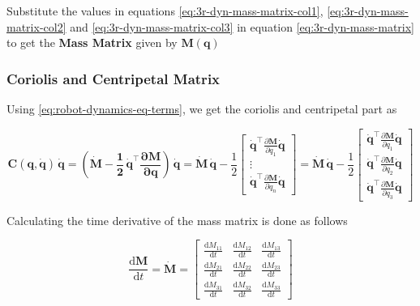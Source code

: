 \noindent
Substitute the values in equations \ref{eq:3r-dyn-mass-matrix-col1}, \ref{eq:3r-dyn-mass-matrix-col2} and \ref{eq:3r-dyn-mass-matrix-col3} in equation \ref{eq:3r-dyn-mass-matrix} to get the \textbf{Mass Matrix} given by $\mathbf{M(q)}$

\subsubsection*{Coriolis and Centripetal Matrix}

Using \ref{eq:robot-dynamics-eq-terms}, we get the coriolis and centripetal part as

\begin{equation}
    \mathbf{C(q, \dot{q}) \, \dot{q}} = \left ( \mathbf{ \dot{M} - \frac{1}{2} \, \dot{q}^\top \frac{\partial M}{\partial q} } \right ) \, \mathbf{\dot{q}} = \mathbf{\dot{M} \, \dot{q}} - \frac{1}{2} \begin{bmatrix}
        \mathbf{\dot{q}^\top} \frac{\partial \mathbf{M}}{\partial q_1} \mathbf{\dot{q}} \\
        \vdots \\
        \mathbf{\dot{q}^\top} \frac{\partial \mathbf{M}}{\partial q_n} \mathbf{\dot{q}}
        \end{bmatrix} 
    = \mathbf{\dot{M} \, \dot{q}} - \frac{1}{2} \begin{bmatrix}
        \mathbf{\dot{q}^\top} \frac{\partial \mathbf{M}}{\partial q_1} \mathbf{\dot{q}} \\
        \mathbf{\dot{q}^\top} \frac{\partial \mathbf{M}}{\partial q_2} \mathbf{\dot{q}} \\
        \mathbf{\dot{q}^\top} \frac{\partial \mathbf{M}}{\partial q_3} \mathbf{\dot{q}}
        \end{bmatrix}
\end{equation}

Calculating the time derivative of the mass matrix is done as follows

\begin{equation}
    \frac{\mathrm{d} \mathbf{M}}{\mathrm{d} t} = \mathbf{\dot{M}} = \begin{bmatrix}
        \frac{\mathrm{d} M_{11}}{\mathrm{d} t} & \frac{\mathrm{d} M_{12}}{\mathrm{d} t} & \frac{\mathrm{d} M_{13}}{\mathrm{d} t} \\
        \frac{\mathrm{d} M_{21}}{\mathrm{d} t} & \frac{\mathrm{d} M_{22}}{\mathrm{d} t} & \frac{\mathrm{d} M_{23}}{\mathrm{d} t} \\
        \frac{\mathrm{d} M_{31}}{\mathrm{d} t} & \frac{\mathrm{d} M_{32}}{\mathrm{d} t} & \frac{\mathrm{d} M_{33}}{\mathrm{d} t}
        \end{bmatrix}
\end{equation}

